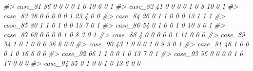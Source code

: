 \documentclass[]{book}
\newenvironment{Shaded}{\begin{snugshade}}{\end{snugshade}}
\newcommand{\CommentTok}[1]{\textcolor[rgb]{0.56,0.35,0.01}{\textit{#1}}}
\begin{document}
\begin{Shaded}
\begin{Highlighting}[]
\CommentTok{#> case_81   86        0        0                0                 0                 1              0                    10                      6           0             1}
\CommentTok{#> case_82   41        0        0                0                 0                 1              0                     8                     10           0             1}
\CommentTok{#> case_83   38        0        0                0                 0                 0              1                    23                      4           0             0}
\CommentTok{#> case_84   26        0        1                1                 0                 0              0                    13                      1           1             1}
\CommentTok{#> case_85   80        1        1                0                 1                 0              0                    13                      7           0             1}
\CommentTok{#> case_86   54        0        1                0                 0                 1              0                    10                      3           0             1}
\CommentTok{#> case_87   69        0        0                0                 0                 1              0                     8                      3           0             1}
\CommentTok{#> case_88    4        0        0                0                 0                 0              1                    11                      0           0             0}
\CommentTok{#> case_89   54        1        0                1                 0                 0              0                    36                      6           0             0}
\CommentTok{#> case_90   43        1        0                0                 0                 1              0                     9                      3           0             1}
\CommentTok{#> case_91   48        1        0                0                 0                 1              0                    16                      6           0             0}
\CommentTok{#> case_92   66        1        1                0                 0                 1              0                    13                      7           0             1}
\CommentTok{#> case_93   56        0        0                0                 0                 1              0                    17                      0           0             0}
\CommentTok{#> case_94   35        0        1                0                 0                 1              0                    13                      6           0             0}

\end{Highlighting}
\end{Shaded}
\end{document}
